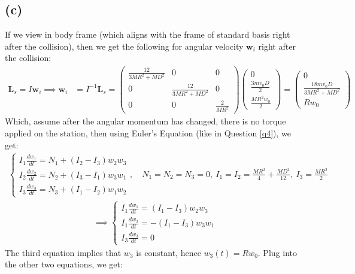 \documentclass{article}
\newcommand{\bL}{\textbf{L}} %
\newcommand{\bw}{\textbf{w}} %
\begin{document}
\subsection*{(c)}
If we view in body frame (which aligns with the frame of standard basis right after the collision), then we get the following for angular velocity $\bw_i$ right after the collision:
\begin{align}
    \bL_s = I\bw_i \implies \bw_i &= I^{-1}\bL_s = \begin{pmatrix}
        \frac{12}{3MR^2+MD^2}&0&0\\
        0&\frac{12}{3MR^2+MD^2}&0\\
        0&0&\frac{2}{MR^2}
    \end{pmatrix}\begin{pmatrix}
        0\\\frac{3mv_0D}{2}\\\frac{MR^2w_0}{2}
    \end{pmatrix} = \begin{pmatrix}
        0\\ \frac{18mv_0D}{3MR^2+MD^2}\\ Rw_0
    \end{pmatrix}
\end{align}
Which, assume after the angular momentum has changed, there is no torque applied on the station, then using Euler's Equation (like in Question \ref{q4}), we get:
\begin{align}
    \begin{cases}
        I_1\frac{dw_1}{dt}=N_1+(I_2-I_3)w_2w_3\\
        I_2\frac{dw_2}{dt}=N_2+(I_3-I_1)w_3w_1\\
        I_3\frac{dw_3}{dt}=N_3+(I_1-I_2)w_1w_2
    \end{cases}, \quad N_1=N_2=N_3=0,\ I_1=I_2 = \frac{MR^2}{4}+\frac{MD^2}{12},\ I_3 = \frac{MR^2}{2}
\end{align}
\begin{align}
    \implies \begin{cases}
        I_1\frac{dw_1}{dt}=(I_1-I_3)w_2w_3\\
        I_1\frac{dw_2}{dt}=-(I_1-I_3)w_3w_1\\
        I_3\frac{dw_3}{dt}=0
    \end{cases}
\end{align}
The third equation implies that $w_3$ is constant, hence $w_3(t)=Rw_0$. Plug into the other two equations, we get:
\end{document}
